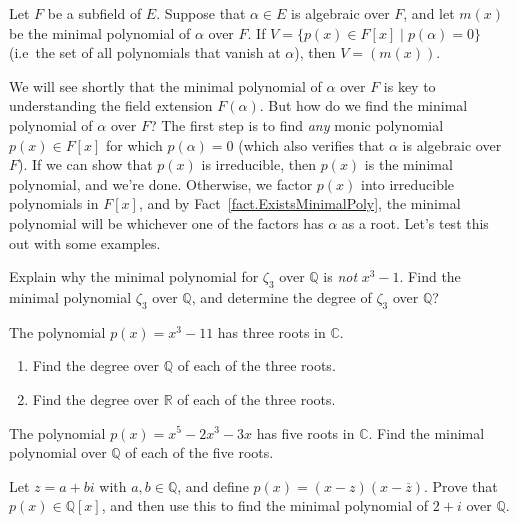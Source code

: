 \begin{theorem}
Let $F$ be a subfield of $E$. Suppose that $\alpha\in E$ is algebraic over $F$, and let $m(x)$ be the minimal polynomial of $\alpha$ over $F$. If $V = \{p(x)\in F[x]\mid p(\alpha) = 0\}$ (i.e~the set of all polynomials that vanish at $\alpha$), then $V = (m(x))$.
\end{theorem}


We will see shortly that the minimal polynomial of $\alpha$ over $F$ is key to understanding the field extension $F(\alpha)$. But how do we find the minimal polynomial of $\alpha$ over $F$? The first step is to find \emph{any} monic polynomial $p(x)\in F[x]$ for which $p(\alpha) = 0$ (which also verifies that $\alpha$ is algebraic over $F$). If we can show that $p(x)$ is irreducible, then $p(x)$ is the minimal polynomial, and we're done. Otherwise, we factor $p(x)$ into irreducible polynomials in $F[x]$, and  by Fact~\ref{fact.ExistsMinimalPoly}, the minimal polynomial will be whichever one of the factors has $\alpha$ as a root. Let's test this out with some examples. 

\begin{problem}\label{prob.MinPolyZeta3}
Explain why the minimal polynomial for $\zeta_3$ over $\mathbb{Q}$ is \textit{not} $x^3-1$. Find the minimal polynomial  $\zeta_3$ over $\mathbb{Q}$, and determine the degree of  $\zeta_3$ over $\mathbb{Q}$?
\end{problem}

\begin{problem}
The polynomial $p(x) = x^3-11$ has three roots in $\mathbb{C}$. 
\begin{enumerate}
\item Find the degree over $\mathbb{Q}$ of each of the three roots.
\item Find the degree over $\mathbb{R}$ of each of the three roots.
\end{enumerate}
\end{problem}


\begin{problem}
The polynomial $p(x) = x^5-2x^3-3x$ has five roots in $\mathbb{C}$. Find the minimal polynomial over $\mathbb{Q}$ of each of the five roots.
\end{problem}

\begin{problem}
Let $z = a+bi$ with $a,b\in \mathbb{Q}$, and define $p(x) = (x-z)(x-\overline{z})$. Prove that $p(x)\in \mathbb{Q}[x]$, and then use this to find the minimal polynomial of $2+i$ over $\mathbb{Q}$.
\end{problem}

